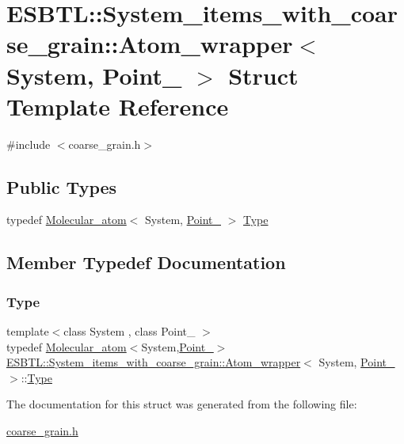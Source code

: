 \hypertarget{structESBTL_1_1System__items__with__coarse__grain_1_1Atom__wrapper}{}\section{E\+S\+B\+TL\+:\+:System\+\_\+items\+\_\+with\+\_\+coarse\+\_\+grain\+:\+:Atom\+\_\+wrapper$<$ System, Point\+\_ $>$ Struct Template Reference}
\label{structESBTL_1_1System__items__with__coarse__grain_1_1Atom__wrapper}


{\ttfamily \#include $<$coarse\+\_\+grain.\+h$>$}

\subsection*{Public Types}
\begin{DoxyCompactItemize}
\item 
typedef \hyperlink{classESBTL_1_1Molecular__atom}{Molecular\+\_\+atom}$<$ System, \hyperlink{classESBTL_1_1Point__3}{Point\+\_} $>$ \hyperlink{structESBTL_1_1System__items__with__coarse__grain_1_1Atom__wrapper_a1b46d28ff94f45fc9f26879ab581f9de}{Type}
\end{DoxyCompactItemize}


\subsection{Member Typedef Documentation}
\mbox{\label{structESBTL_1_1System__items__with__coarse__grain_1_1Atom__wrapper_a1b46d28ff94f45fc9f26879ab581f9de}} 
\subsubsection{\texorpdfstring{Type}{Type}}
{\footnotesize\ttfamily template$<$class System , class Point\+\_ $>$ \\
typedef \hyperlink{classESBTL_1_1Molecular__atom}{Molecular\+\_\+atom}$<$System,\hyperlink{classESBTL_1_1Point__3}{Point\+\_}$>$ \hyperlink{structESBTL_1_1System__items__with__coarse__grain_1_1Atom__wrapper}{E\+S\+B\+T\+L\+::\+System\+\_\+items\+\_\+with\+\_\+coarse\+\_\+grain\+::\+Atom\+\_\+wrapper}$<$ System, \hyperlink{classESBTL_1_1Point__3}{Point\+\_} $>$\+::\hyperlink{structESBTL_1_1System__items__with__coarse__grain_1_1Atom__wrapper_a1b46d28ff94f45fc9f26879ab581f9de}{Type}}



The documentation for this struct was generated from the following file\+:\begin{DoxyCompactItemize}
\item 
\hyperlink{coarse__grain_8h}{coarse\+\_\+grain.\+h}\end{DoxyCompactItemize}
